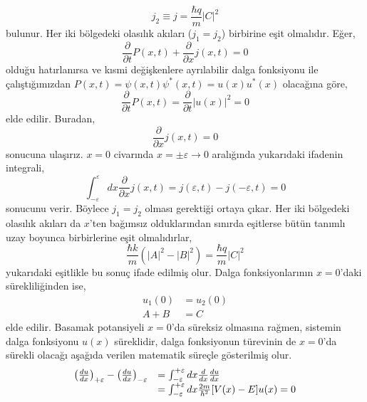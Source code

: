 \documentclass[00_kitap.tex]{subfiles}
\begin{document}
\begin{equation}
j_2 \equiv j = \frac { \hbar q } { m } | C | ^ { 2 }
\end{equation}
bulunur. Her iki bölgedeki olasılık akıları ($j_1 = j_2$) birbirine eşit olmalıdır. Eğer,
\begin{equation}
\frac { \partial } { \partial t } P ( x , t ) + \frac { \partial } { \partial x } j ( x , t ) = 0
\end{equation}
olduğu hatırlanırsa ve kısmi değişkenlere ayrılabilir dalga fonksiyonu ile çalıştığımızdan $P(x, t) = \psi(x,t) \psi^*(x,t) = u(x) u^*(x)$ olacağına göre,
\begin{equation}\label{key}
\frac { \partial } { \partial t } P ( x , t ) = \frac { \partial } { \partial t } |u ( x)|^2 = 0
\end{equation}
elde edilir. Buradan,
\begin{equation}
\frac { \partial } { \partial x } j ( x , t ) = 0
\end{equation}
sonucuna ulaşırız. $x=0$ civarında $x=\pm\varepsilon \rightarrow 0$ aralığında yukarıdaki ifadenin integrali,
\begin{equation}
\int^{\varepsilon}_{-\varepsilon} dx \frac { \partial } { \partial x } j ( x , t ) = j (\varepsilon  , t ) - j ( -\varepsilon , t ) = 0
\end{equation}
sonucunu verir. Böylece $j_1 = j_2$ olması gerektiği ortaya çıkar. Her iki bölgedeki olasılık akıları da $x$'ten bağımsız olduklarından sınırda eşitlerse bütün tanımlı uzay boyunca birbirlerine eşit olmalıdırlar,
\begin{equation}
\frac { \hbar k } { m } \left( | A | ^ { 2 }  - | B | ^ { 2 } \right) = \frac { \hbar q } { m } | C | ^ { 2 }
\end{equation}
yukarıdaki eşitlikle bu sonuç ifade edilmiş olur. Dalga fonksiyonlarının $x=0$'daki sürekliliğinden ise,
\begin{align}
u_1(0) &= u_2(0) \\
A + B  &= C
\end{align}
elde edilir. Basamak potansiyeli $x=0$'da süreksiz olmasına rağmen, sistemin dalga fonksiyonu $u(x)$ süreklidir, dalga fonksiyonun türevinin de $x=0$'da sürekli olacağı aşağıda verilen matematik süreçle gösterilmiş olur.
\begin{equation}
\begin{array} { r l } { \left( \frac { d u } { d x } \right) _ { +\varepsilon } - \left( \frac { d u } { d x } \right) _ { - \varepsilon } } & { = \int _ { - \varepsilon } ^ { +\varepsilon } d x \frac { d } { d x } \frac { d u } { d x } } \\ { } & { = \int _ { - \varepsilon } ^ { +\varepsilon } d x \frac { 2 m } { \hbar ^ { 2 } } [ V ( x ) - E ] u ( x ) = 0 } \end{array}
\end{equation}
\end{document}

